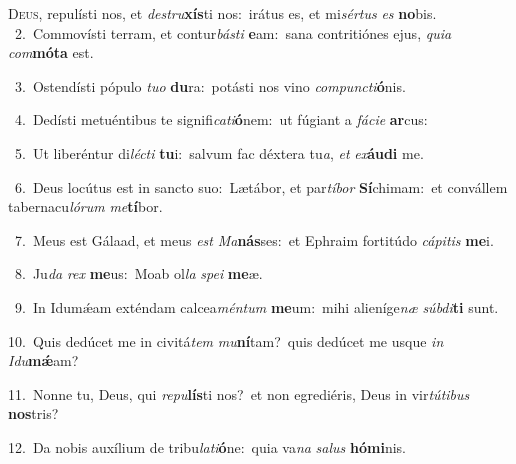 \lettrine{\initial\textcolor{\initialcolor}{D}}{eus,} repulísti nos, et \textit{de}\-\textit{stru}\textbf{xís}ti nos:~\star irátus es, et mi\-\textit{sér}\-\textit{tus} \textit{es} \textbf{no}\-bis.\\
{\numbfont\textcolor{\numbcolor}{~2.}}~Commovísti terram, et contur\-\textit{bás}\-\textit{ti} \textbf{e}\-am:~\star sana contritiónes ejus, \textit{qui}\-\textit{a} \textit{com}\-\textbf{mó}\textbf{ta} est.\par
{\numbfont\textcolor{\numbcolor}{~3.}}~Ostendísti pópulo \textit{tu}\-\textit{o} \textbf{du}\-ra:~\star potásti nos vino \textit{com}\-\textit{punc}\textit{ti}\textbf{ó}nis.\par
{\numbfont\textcolor{\numbcolor}{~4.}}~Dedísti metuéntibus te signifi\-\textit{ca}\-\textit{ti}\textbf{ó}nem:~\star ut fúgiant a \textit{fá}\-\textit{ci}\textit{e} \textbf{ar}\-cus:\par
{\numbfont\textcolor{\numbcolor}{~5.}}~Ut liberéntur di\-\textit{léc}\-\textit{ti} \textbf{tu}\-i:~\star salvum fac déxtera tu\-\textit{a}\-, \textit{et} \textit{ex}\-\textbf{áu}\textbf{di} me.\par
{\numbfont\textcolor{\numbcolor}{~6.}}~Deus locútus est in sancto suo:~\dagger Lætábor, et par\-\textit{tí}\-\textit{bor} \textbf{Sí}\-chimam:~\star et convállem tabernacu\-\textit{ló}\-\textit{rum} \textit{me}\-\textbf{tí}bor.\par
{\numbfont\textcolor{\numbcolor}{~7.}}~Meus est Gálaad, et meus \textit{est} \textit{Ma}\-\textbf{nás}ses:~\star et Ephraim fortitúdo \textit{cá}\-\textit{pi}\textit{tis} \textbf{me}\-i.\par
{\numbfont\textcolor{\numbcolor}{~8.}}~Ju\textit{da} \textit{rex} \textbf{me}\-us:~\star Moab ol\textit{la} \textit{spe}\-\textit{i} \textbf{me}\-æ.\par
{\numbfont\textcolor{\numbcolor}{~9.}}~In Idumǽam exténdam calcea\-\textit{mén}\-\textit{tum} \textbf{me}\-um:~\star mihi alieníge\textit{næ} \textit{súb}\-\textit{di}\textbf{ti} sunt.\par
{\numbfont\textcolor{\numbcolor}{10.}}~Quis dedúcet me in civitá\textit{tem} \textit{mu}\-\textbf{ní}tam?~\star quis dedúcet me usque \textit{in} \textit{I}\-\textit{du}\textbf{mǽ}am?\par
{\numbfont\textcolor{\numbcolor}{11.}}~Nonne tu, Deus, qui \textit{re}\-\textit{pu}\textbf{lís}ti nos?~\star et non egrediéris, Deus in vir\-\textit{tú}\-\textit{ti}\textit{bus} \textbf{nos}\-tris?\par
{\numbfont\textcolor{\numbcolor}{12.}}~Da nobis auxílium de tribu\-\textit{la}\-\textit{ti}\textbf{ó}ne:~\star quia va\textit{na} \textit{sa}\-\textit{lus} \textbf{hó}\-\textbf{mi}nis.\par
